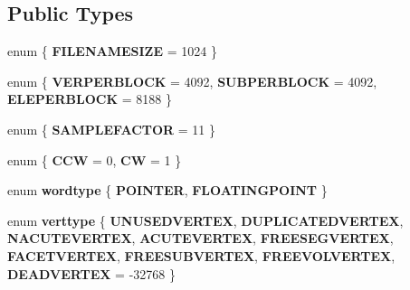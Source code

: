 \subsection*{Public Types}
\begin{DoxyCompactItemize}
\item 
\mbox{\label{classStemMesh3D_1_1tetgenmesh_a47b2d5b741c5d1f3aea8b765aced9d3b}} 
enum \{ {\bfseries F\+I\+L\+E\+N\+A\+M\+E\+S\+I\+ZE} = 1024
 \}
\item 
\mbox{\label{classStemMesh3D_1_1tetgenmesh_a9dcc9d790f721d7a0f4f09a84e9441fb}} 
enum \{ {\bfseries V\+E\+R\+P\+E\+R\+B\+L\+O\+CK} = 4092, 
{\bfseries S\+U\+B\+P\+E\+R\+B\+L\+O\+CK} = 4092, 
{\bfseries E\+L\+E\+P\+E\+R\+B\+L\+O\+CK} = 8188
 \}
\item 
\mbox{\label{classStemMesh3D_1_1tetgenmesh_a5d911914e7f049039ad318a4fc5c5e2b}} 
enum \{ {\bfseries S\+A\+M\+P\+L\+E\+F\+A\+C\+T\+OR} = 11
 \}
\item 
\mbox{\label{classStemMesh3D_1_1tetgenmesh_a5af38261548ab74f0e5f4b8e070972cc}} 
enum \{ {\bfseries C\+CW} = 0, 
{\bfseries CW} = 1
 \}
\item 
\mbox{\label{classStemMesh3D_1_1tetgenmesh_a1abc5c68feadf753aa1d4c0a50c987a5}} 
enum {\bfseries wordtype} \{ {\bfseries P\+O\+I\+N\+T\+ER}, 
{\bfseries F\+L\+O\+A\+T\+I\+N\+G\+P\+O\+I\+NT}
 \}
\item 
\mbox{\label{classStemMesh3D_1_1tetgenmesh_a009cb173727c930b7e64c0fa3959bcf4}} 
enum {\bfseries verttype} \{ \newline
{\bfseries U\+N\+U\+S\+E\+D\+V\+E\+R\+T\+EX}, 
{\bfseries D\+U\+P\+L\+I\+C\+A\+T\+E\+D\+V\+E\+R\+T\+EX}, 
{\bfseries N\+A\+C\+U\+T\+E\+V\+E\+R\+T\+EX}, 
{\bfseries A\+C\+U\+T\+E\+V\+E\+R\+T\+EX}, 
\newline
{\bfseries F\+R\+E\+E\+S\+E\+G\+V\+E\+R\+T\+EX}, 
{\bfseries F\+A\+C\+E\+T\+V\+E\+R\+T\+EX}, 
{\bfseries F\+R\+E\+E\+S\+U\+B\+V\+E\+R\+T\+EX}, 
{\bfseries F\+R\+E\+E\+V\+O\+L\+V\+E\+R\+T\+EX}, 
\newline
{\bfseries D\+E\+A\+D\+V\+E\+R\+T\+EX} = -\/32768
 \}
\item 

\end{DoxyCompactItemize}
